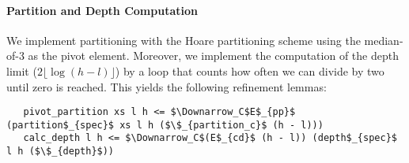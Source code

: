 \documentclass[acmsmall]{acmart}
\newcommand{\is}{\lstinline[language=isabelle]}
\begin{document}



\paragraph{Partition and Depth Computation}
We implement partitioning with the Hoare partitioning scheme using the median-of-3 as the pivot element. Moreover, we implement the computation of the depth limit ($2\lfloor\log (h - l)\rfloor$) by a loop that counts how often we can divide by two until zero is reached. This yields the following refinement lemmas:
\begin{lstlisting}
   pivot_partition xs l h <= $\Downarrow_C$E$_{pp}$ (partition$_{spec}$ xs l h ($\$_{partition_c}$ (h - l)))
   calc_depth l h <= $\Downarrow_C$(E$_{cd}$ (h - l)) (depth$_{spec}$ l h ($\$_{depth}$))
\end{lstlisting}
%
\end{document}
